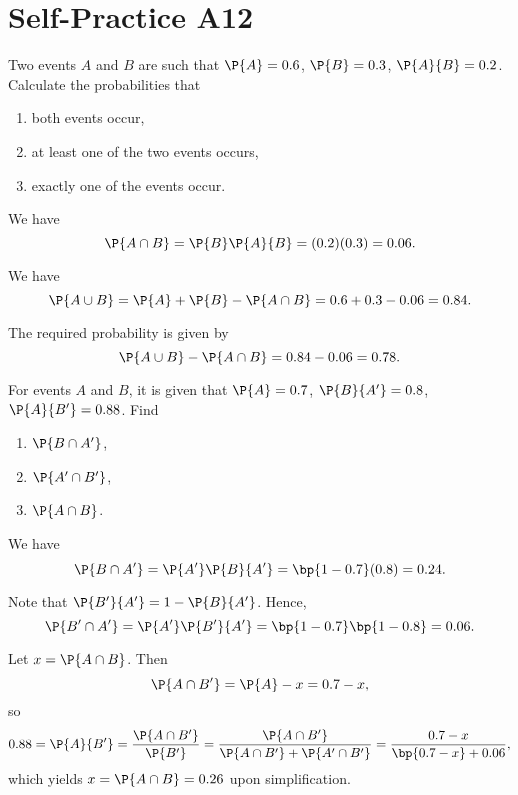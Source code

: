 \section{Self-Practice A12}

\begin{problem}
    Two events $A$ and $B$ are such that $\P{A} = 0.6$, $\P{B} = 0.3$, $\P{A}{B} = 0.2$. Calculate the probabilities that
    \begin{enumerate}
        \item both events occur,
        \item at least one of the two events occurs,
        \item exactly one of the events occur.
    \end{enumerate}
\end{problem}
\begin{solution}
    \begin{ppart}
        We have \[\P{A \cap B} = \P{B} \P{A}{B} = (0.2)(0.3) = 0.06.\]
    \end{ppart}
    \begin{ppart}
        We have \[\P{A \cup B} = \P{A} + \P{B} - \P{A \cap B} = 0.6 + 0.3 - 0.06 = 0.84.\]
    \end{ppart}
    \begin{ppart}
        The required probability is given by \[\P{A \cup B} - \P{A \cap B} = 0.84 - 0.06 = 0.78.\]
    \end{ppart}
\end{solution}

\begin{problem}
    For events $A$ and $B$, it is given that $\P{A} = 0.7$, $\P{B}{A'} = 0.8$, $\P{A}{B'} = 0.88$. Find
    \begin{enumerate}
        \item $\P{B \cap A'}$,
        \item $\P{A' \cap B'}$,
        \item $\P{A \cap B}$.
    \end{enumerate}
\end{problem}
\begin{solution}
    \begin{ppart}
        We have \[\P{B \cap A'} = \P{A'} \P{B}{A'} = \bp{1 - 0.7}(0.8) = 0.24.\]
    \end{ppart}
    \begin{ppart}
        Note that $\P{B'}{A'} = 1 - \P{B}{A'}$. Hence, \[\P{B' \cap A'} = \P{A'} \P{B'}{A'} = \bp{1 -0.7} \bp{1 - 0.8} = 0.06.\]
    \end{ppart}
    \begin{ppart}
        Let $x = \P{A \cap B}$. Then \[\P{A \cap B'} = \P{A} - x = 0.7 - x,\] so \[0.88 = \P{A}{B'} = \frac{\P{A \cap B'}}{\P{B'}} = \frac{\P{A \cap B'}}{\P{A \cap B'} + \P{A' \cap B'}} = \frac{0.7 - x}{\bp{0.7 - x} + 0.06},\] which yields $x = \P{A \cap B} = 0.26$ upon simplification.
    \end{ppart}
\end{solution}

